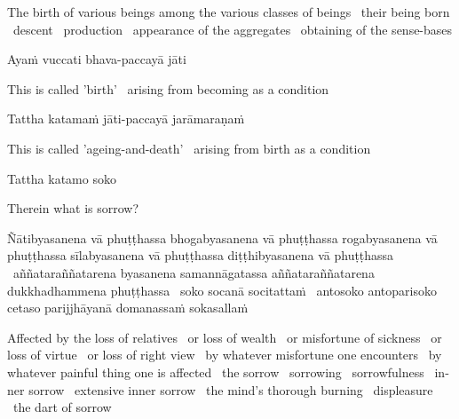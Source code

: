 \begin{english}
  The birth of various beings among the various classes of beings \breathmark\ their being born \breathmark\ descent \breathmark\ production \breathmark\ appearance of the aggregates \breathmark\ obtaining of the sense-bases
\end{english}

Ayaṁ vuccati bhava-paccayā jāti

\begin{english}
  This is called 'birth' \breathmark\ arising from becoming as a condition
\end{english}

Tattha katamaṁ jāti-paccayā jarāmaraṇaṁ

\begin{english}
  This is called 'ageing-and-death' \breathmark\ arising from birth as a condition
\end{english}

Tattha katamo soko

\begin{english}
  Therein what is sorrow?
\end{english}

Ñātibyasanena vā phuṭṭhassa bhogabyasanena vā phuṭṭhassa rogabyasanena vā phuṭṭhassa sīlabyasanena vā phuṭṭhassa diṭṭhibyasanena vā phuṭṭhassa \breathmark\ aññataraññatarena byasanena samannāgatassa aññataraññatarena dukkhadhammena phuṭṭhassa \breathmark\ soko socanā socitattaṁ \breathmark\ antosoko antoparisoko cetaso parijjhāyanā domanassaṁ sokasallaṁ

\begin{english}
  Affected by the loss of relatives \breathmark\ or loss of wealth \breathmark\ or misfortune of sickness \breathmark\ or loss of virtue \breathmark\ or loss of right view
  \breathmark\ by whatever misfortune one encounters \breathmark\ by whatever painful thing one is affected \breathmark\ the sorrow \breathmark\ sorrowing \breathmark\ sorrowfulness \breathmark\ inner sorrow \breathmark\ extensive inner sorrow \breathmark\ the mind’s thorough burning \breathmark\ displeasure \breathmark\ the dart of sorrow
\end{english}

